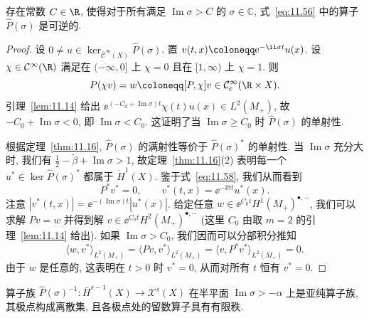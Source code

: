 \begin{proposition}\label{prop:11.18}
存在常数 $C \in \R$, 使得对于所有满足 $\operatorname{Im}\sigma > C$ 的 $\sigma \in \mathbb{C}$, 式~\eqref{eq:11.56} 中的算子 $\widehat{P}(\sigma)$ 是可逆的.
\end{proposition}

\begin{proof}
设 $0 \neq u \in \ker_{\bar{\mathcal{C}}^\infty(X)} \widehat{P}(\sigma)$. 置 $v(t, x) \defeq \ee^{-\ii \sigma t} u(x)$. 设 $\chi \in \mathcal{C}^\infty(\R)$ 满足在 $(-\infty, 0]$ 上 $\chi = 0$ 且在 $[1, \infty)$ 上 $\chi = 1$. 则
\begin{equation}\label{eq:11.75}
    P(\chi v) = w \defeq [P, \chi] v \in \mathcal{C}_{\mathrm{c}}^\infty(\R \times X).
\end{equation}
引理~\ref{lem:11.14} 给出 $\ee^{(-C_0 + \operatorname{Im}\sigma)t} \chi(t) u(x) \in L^2(M_+)$, 故 $-C_0 + \operatorname{Im}\sigma < 0$, 即 $\operatorname{Im}\sigma < C_0$. 这证明了当 $\operatorname{Im}\sigma \ge C_0$ 时 $\widehat{P}(\sigma)$ 的单射性.

根据定理~\ref{thm:11.16}, $\widehat{P}(\sigma)$ 的满射性等价于 $\widehat{P}(\sigma)^*$ 的单射性. 当 $\operatorname{Im}\sigma$ 充分大时, 我们有 $\frac{1}{2} - \tilde\beta + \operatorname{Im}\sigma > 1$, 故定理~\ref{thm:11.16}(2) 表明每一个 $u^* \in \ker \widehat{P}(\sigma)^*$ 都属于 $\dot H^1(X)$. 鉴于式~\eqref{eq:11.58}, 我们从而看到
\begin{equation}\label{eq:11.76}
    P^* v^* = 0, \qquad v^*(t, x) = \ee^{-\ii \bar\sigma t} u^*(x).
\end{equation}
注意 $|v^*(t, x)| = \ee^{-(\operatorname{Im}\sigma)t} |u^*(x)|$. 给定任意 $w \in \ee^{C_0 t} H^1(M_+)^{\bullet, -}$, 我们可以求解 $P v = w$ 并得到解 $v \in \ee^{C_0 t} H^2(M_+)^{\bullet, -}$ (这里 $C_0$ 由取 $m = 2$ 的引理~\ref{lem:11.14} 给出). 如果 $\operatorname{Im}\sigma > C_0$, 我们因而可以分部积分推知
\begin{equation}\label{eq:11.77}
    \langle w, v^* \rangle_{L^2(M_+)} = \langle Pv, v^* \rangle_{L^2(M_+)} = \langle v, P^* v^* \rangle_{L^2(M_+)} = 0.
\end{equation}
由于 $w$ 是任意的, 这表明在 $t > 0$ 时 $v^* = 0$, 从而对所有 $t$ 恒有 $v^* = 0$.
\end{proof}

\begin{corollary}[预解算子的亚纯性]\label{cor:11.19}
算子族 $\widehat{P}(\sigma)^{-1} \colon \bar H^{s-1}(X) \to \mathcal{X}^s(X)$ 在半平面 $\operatorname{Im}\sigma > -\alpha$ 上是亚纯算子族, 其极点构成离散集, 且各极点处的留数算子具有有限秩.
\end{corollary}


